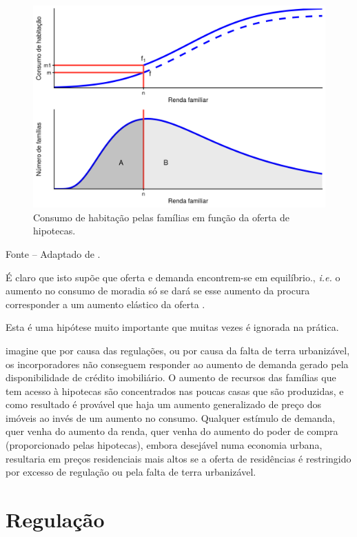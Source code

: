 \documentclass[
	12pt,				%
	oneside,			%
	a4paper,			%
	chapter=TITLE,		%
	section=TITLE,		%
	english,			%
	brazil				%
	]{abntex2}
\newcommand{\bcenter}{\begin{center}}
\newcommand{\ecenter}{\end{center}}
\begin{document}
\begin{refsection}
\begin{figure}[H]
{\centering \includegraphics[width=0.7\linewidth]{images/ofertaHipotecas-1} 

}

\caption{Consumo de habitação pelas famílias em função da oferta de hipotecas.}\label{fig:ofertaHipotecas}
\end{figure}
\bcenter

Fonte -- Adaptado de \textcite[p.~255]{bertaud}.
\ecenter

É claro que isto supõe que oferta e demanda encontrem-se em equilíbrio., \emph{i.e.}
o aumento no consumo de moradia só se dará se esse aumento da procura
corresponder a um aumento elástico da oferta \autocite[220]{bertaud}.

Esta é uma hipótese muito importante que muitas vezes é ignorada na prática.
\begin{citacao}
imagine que por causa das regulações, ou por causa da falta de terra
urbanizável, os incorporadores não conseguem responder ao aumento de demanda
gerado pela disponibilidade de crédito imobiliário. O aumento de recursos das
famílias que tem acesso à hipotecas são concentrados nas poucas casas que são
produzidas, e como resultado é provável que haja um aumento generalizado de
preço dos imóveis ao invés de um aumento no consumo. Qualquer estímulo de
demanda, quer venha do aumento da renda, quer venha do aumento do poder de
compra (proporcionado pelas hipotecas), embora desejável numa economia urbana,
resultaria em preços residenciais mais altos se a oferta de residências é
restringido por excesso de regulação ou pela falta de terra urbanizável.
\cite[p. 255-256]{bertaud}
\end{citacao}
\hypertarget{regulauxe7uxe3o}{%
\section{Regulação}\label{regulauxe7uxe3o}}


\end{refsection}
\end{document}
